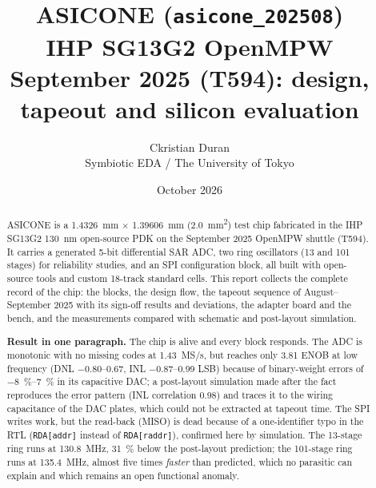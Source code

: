 \documentclass[10pt,a4paper]{article}
\title{ASICONE (\texttt{asicone\_202508})\\[4pt]
\large IHP SG13G2 OpenMPW September 2025 (T594): design, tapeout and silicon evaluation}
\author{Ckristian Duran\\\small Symbiotic EDA / The University of Tokyo}
\date{October 2026}
\begin{document}
\maketitle

\begin{abstract}
ASICONE is a \SI{1.4326}{mm} $\times$ \SI{1.39606}{mm} (\SI{2.0}{mm^2}) test chip fabricated in the IHP SG13G2
\SI{130}{nm} open-source PDK on the September 2025 OpenMPW shuttle (T594). It carries a generated
5-bit differential SAR ADC, two ring oscillators (13 and 101 stages) for reliability studies, and an SPI
configuration block, all built with open-source tools and custom 18-track standard cells. This report
collects the complete record of the chip: the blocks, the design flow, the tapeout sequence of
August--September 2025 with its sign-off results and deviations, the adapter board and the bench, and
the measurements compared with schematic and post-layout simulation.

\noindent\textbf{Result in one paragraph.} The chip is alive and every block responds. The ADC is
monotonic with no missing codes at \SI{1.43}{MS/s}, but reaches only 3.81 ENOB at low frequency
(DNL \numrange{-0.80}{0.67}, INL \numrange{-0.87}{0.99} LSB) because of binary-weight errors of
\SIrange{-8}{+7}{\percent} in its capacitive DAC; a post-layout simulation made after the fact
reproduces the error pattern (INL correlation 0.98) and traces it to the wiring capacitance of the DAC
plates, which could not be extracted at tapeout time. The SPI writes work, but the read-back (MISO)
is dead because of a one-identifier typo in the RTL (\texttt{RDA[addr]} instead of
\texttt{RDA[raddr]}), confirmed here by simulation. The 13-stage ring runs at \SI{130.8}{MHz},
\SI{31}{\percent} below the post-layout prediction; the 101-stage ring runs at \SI{135.4}{MHz}, almost
five times \emph{faster} than predicted, which no parasitic can explain and which remains an open
functional anomaly.
\end{abstract}

\tableofcontents
\newpage

\end{document}
